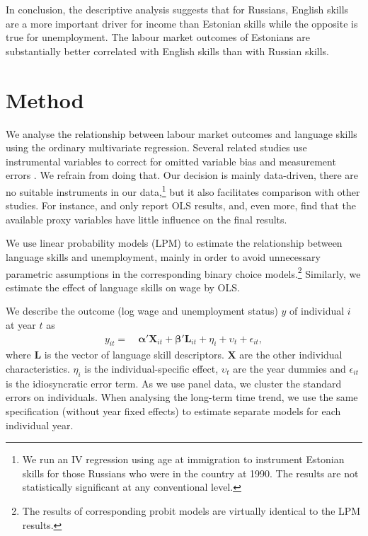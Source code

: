 \documentclass[12pt, a4paper]{article}
\renewcommand*{\vec}[1]{\boldsymbol{#1}}
\begin{document}
In conclusion, the descriptive analysis suggests that for Russians,
English skills are a more important driver for income than Estonian
skills while the opposite is true for unemployment. The labour market
outcomes of Estonians are substantially better correlated with English
skills than with Russian skills.



\section{Method}
\label{sec:method}

We analyse the relationship between labour market outcomes and language
skills using the ordinary multivariate regression.
Several related studies use instrumental variables to correct for
omitted variable bias and measurement errors \citep{Chiswick1995, bleakley+chin2004}.
We refrain from doing that. Our decision is mainly data-driven,
there are no suitable instruments in our data,\footnote{We run an IV
	regression using age at immigration to instrument Estonian skills
for those Russians who were in the country at 1990. The results are
	not statistically significant at any conventional level.} but it also facilitates
comparison with other studies. For instance,
\citet{azam+2013EDandCC} and \citet{paolo+tansel2015JofDevStud} only
report OLS results, and, even more, find that the available proxy
variables have little influence on the final results.

We use linear probability models (LPM) to estimate the relationship between
language skills and unemployment, mainly in order to avoid unnecessary parametric
assumptions in the corresponding binary choice models.\footnote{The
	results of corresponding probit models are virtually identical to the LPM results.}
Similarly, we estimate the effect of language skills on wage by
OLS. 

We describe the outcome (log wage and unemployment status) $y$ of individual $i$ at year $t$ as
\begin{equation}
	\label{eq:specification}
	\begin{split}                            
		y_{it} = &\: \vec{\alpha}' \vec{X}_{it} + \vec{\beta}{}' \vec{L}_{it} +
		\eta_{i} +
		\upsilon_{t} + \epsilon_{it},                                                                             
	\end{split}
\end{equation}
where $\vec{L}$ is the vector of
language skill descriptors. $\vec{X}$ are the other individual
characteristics. $\eta_{i}$ is the individual-specific effect, $\upsilon_{t}$ are the year dummies and $\epsilon_{it}$
is the idiosyncratic error term. 
As we use panel data, we cluster the
standard errors on individuals. When analysing the long-term time
trend, we use the same specification (without year fixed effects) to
estimate separate models for each individual year.
\end{document}
